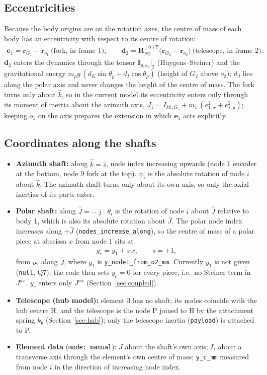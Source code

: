 \documentclass[10pt,a4paper]{article}
\numberwithin{equation}{section}
\begin{document}
\subsection{Eccentricities}\label{subsec:eccentricity}
Because the body origins are on the rotation axes, the centre of mass of each body has an eccentricity with respect to its centre of rotation:
\begin{gather}
\mathbf e_1 = \mathbf r_{G_1} - \mathbf r_{o_1}\ \text{(fork, in frame 1)}, \qquad \mathbf d_2 = \mathbf R_{N2}^{(0)\mathsf T}\bigl(\mathbf r_{G_2} - \mathbf r_{o_2}\bigr)\ \text{(telescope, in frame 2)}.
\end{gather}
$\mathbf d_2$ enters the dynamics through the tensor $\mathbf I_{p,o_2}|_2$ (Huygens--Steiner) and the gravitational energy $m_p g\,(d_K\sin\theta_p + d_I\cos\theta_p)$ (height of $G_2$ above $o_2$); $d_J$ lies along the polar axis and never changes the height of the centre of mass. The fork turns only about $\hat k$, so in the current model its eccentricity enters only through its moment of inertia about the azimuth axis, $J_1 = I_{kk,G_1} + m_1\,(e_{1,x}^2 + e_{1,y}^2)$; keeping $o_1$ on the axis prepares the extension in which $\mathbf e_1$ acts explicitly.
\subsection{Coordinates along the shafts}
\begin{itemize}
\item \textbf{Azimuth shaft:} along $\hat k = \hat z$, node index increasing upwards (node 1 encoder at the bottom, node 9 fork at the top). $\psi_i$ is the absolute rotation of node $i$ about $\hat k$. The azimuth shaft turns only about its own axis, so only the axial inertias of its parts enter.
\item \textbf{Polar shaft:} along $\hat J = -\hat\jmath$. $\theta_i$ is the rotation of node $i$ about $\hat J$ relative to body 1, which is also its absolute rotation about $\hat J$. The polar node index increases along $+\hat J$ (\texttt{nodes\_increase\_along}), so the centre of mass of a polar piece at abscissa $x$ from node 1 sits at
\begin{gather}
y_c = y_1 + s\,x, \qquad s = +1,
\end{gather}
from $o_2$ along $\hat J$, where $y_1$ is \texttt{y\_node1\_from\_o2\_mm}. Currently $y_1$ is not given (\texttt{null}, Q7): the code then sets $y_c = 0$ for every piece, i.e.\ no Steiner term in $J^{ax}$. $y_c$ enters only $J^{ax}$ (Section~\ref{sec:coupled}).
\item \textbf{Telescope (hub model):} element 3 has no shaft; its nodes coincide with the hub centre H, and the telescope is the node P joined to H by the attachment spring $k_b$ (Section~\ref{sec:hub}); only the telescope inertia (\texttt{payload}) is attached to P.
\item \textbf{Element data} (\texttt{mode: manual}): $J$ about the shaft's own axis; $I_t$ about a transverse axis through the element's own centre of mass; \texttt{y\_c\_mm} measured from node $i$ in the direction of increasing node index.
\end{itemize}
\end{document}
